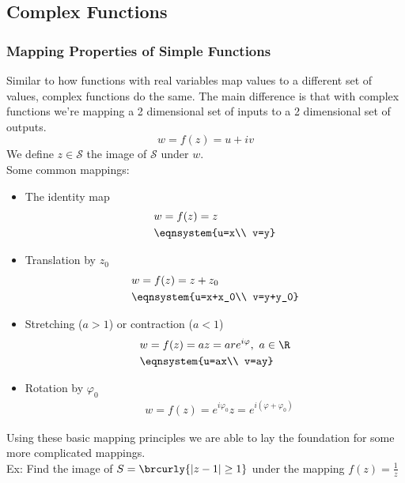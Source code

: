 \subsection{Complex Functions}
\subsubsection{Mapping Properties of Simple Functions}
Similar to how functions with real variables map values to a different set of values, complex functions do the same. The main difference is that with complex functions we're mapping a 2 dimensional set of inputs to a 2 dimensional set of outputs.
\[
w=f(z)=u+iv
\]
We define $z\in \mathcal{S}$ the image of $\mathcal{S}$ under $w$.\\
Some common mappings:
\begin{itemize}
    \item The identity map
    \begin{align*}
        &w=f(z)=z\\
        &\eqnsystem{u=x\\ v=y}
    \end{align*}
    \item Translation by $z_0$
    \begin{align*}
        &w=f(z)=z+z_0\\
        &\eqnsystem{u=x+x_0\\ v=y+y_0}
    \end{align*}
    \item Stretching ($a>1$) or contraction ($a<1$)
    \begin{align*}
        &w=f(z)=az=are^{i\varphi},\ a\in\R\\
        &\eqnsystem{u=ax\\ v=ay}
    \end{align*}
    \item Rotation by $\varphi_0$
    \begin{align*}
        &w=f(z)=e^{i\varphi_0}z=e^{i(\varphi+\varphi_0)}
    \end{align*}
\end{itemize}
Using these basic mapping principles we are able to lay the foundation for some more complicated mappings.\\
Ex: Find the image of $S=\brcurly{|z-1|\geq1}$ under the mapping $f(z)=\frac{1}{z}$\\

